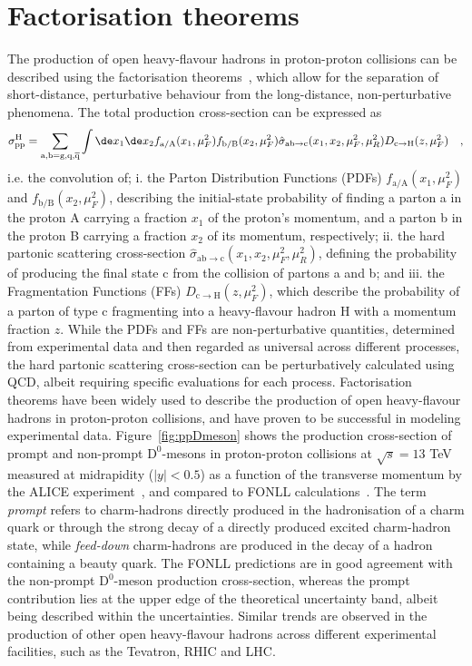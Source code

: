 \section{Factorisation theorems}
The production of open heavy-flavour hadrons in proton-proton collisions can be described using the factorisation theorems~\cite{Collins:1989gx}, which allow for the separation of short-distance, perturbative behaviour from the long-distance, non-perturbative phenomena. The total production cross-section can be expressed as
\begin{equation*}
    \sigma_{\text{pp}}^\mathrm{H} = \sum_\mathrm{a,b = g, q, \overline{q}} \int \de x_1 \de x_2 f_\mathrm{a/A}(x_1,\mu_F^2) f_\mathrm{b/B}(x_2,\mu_F^2) \hat{\sigma}_\mathrm{ab \rightarrow c} (x_1,x_2,\mu_F^2,\mu_R^2) D_\mathrm{c\rightarrow H}(z,\mu_F^2) \quad ,
\end{equation*}
i.e. the convolution of; i. the Parton Distribution Functions (PDFs) $f_\mathrm{a/A}(x_1,\mu_F^2)$ and $f_\mathrm{b/B}(x_2,\mu_F^2)$, describing the initial-state probability of finding a parton a in the proton A carrying a fraction $x_1$ of the proton's momentum, and a parton b in the proton B carrying a fraction $x_2$ of its momentum, respectively; ii. the hard partonic scattering cross-section $\hat{\sigma}_\mathrm{ab \rightarrow c} (x_1,x_2,\mu_F^2,\mu_R^2)$, defining the probability of producing the final state c from the collision of partons a and b; and iii. the Fragmentation Functions (FFs) $D_\mathrm{c\rightarrow H}(z,\mu_F^2)$, which describe the probability of a parton of type c fragmenting into a heavy-flavour hadron H with a momentum fraction $z$. While the PDFs and FFs are non-perturbative quantities, determined from experimental data and then regarded as universal across different processes, the hard partonic scattering cross-section can be perturbatively calculated using QCD, albeit requiring specific evaluations for each process. Factorisation theorems have been widely used to describe the production of open heavy-flavour hadrons in proton-proton collisions, and have proven to be successful in modeling experimental data. Figure~\ref{fig:ppDmeson} shows the production cross-section of prompt and non-prompt $\mathrm{D^0}$-mesons in proton-proton collisions at $\sqrt{s} = 13$ TeV measured at midrapidity ($\lvert y\rvert<0.5$) as a function of the transverse momentum by the ALICE experiment~\cite{ALICE:2021mgk}, and compared to FONLL calculations~\cite{Cacciari:1998it}. The term \emph{prompt} refers to charm-hadrons directly produced in the hadronisation of a charm quark or through the strong decay of a directly produced excited charm-hadron state, while \emph{feed-down} charm-hadrons are produced in the decay of a hadron containing a beauty quark. The FONLL predictions are in good agreement with the non-prompt $\mathrm{D^0}$-meson production cross-section, whereas the prompt contribution lies at the upper edge of the theoretical uncertainty band, albeit being described within the uncertainties.  Similar trends are observed in the production of other open heavy-flavour hadrons across different experimental facilities, such as the Tevatron, RHIC and LHC.

